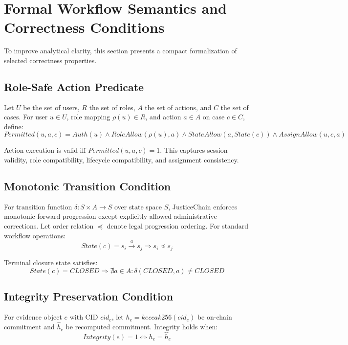 \documentclass[conference]{IEEEtran}
\begin{document}
\section{Formal Workflow Semantics and Correctness Conditions}
To improve analytical clarity, this section presents a compact formalization of selected correctness properties.

\subsection{Role-Safe Action Predicate}
Let $U$ be the set of users, $R$ the set of roles, $A$ the set of actions, and $C$ the set of cases. For user $u \in U$, role mapping $\rho(u) \in R$, and action $a \in A$ on case $c \in C$, define:
\begin{equation}
Permitted(u,a,c) = Auth(u) \land RoleAllow(\rho(u),a) \land StateAllow(a,State(c)) \land AssignAllow(u,c,a)
\end{equation}

Action execution is valid iff $Permitted(u,a,c)=1$. This captures session validity, role compatibility, lifecycle compatibility, and assignment consistency.

\subsection{Monotonic Transition Condition}
For transition function $\delta: S \times A \rightarrow S$ over state space $S$, JusticeChain enforces monotonic forward progression except explicitly allowed administrative corrections. Let order relation $\preceq$ denote legal progression ordering. For standard workflow operations:
\begin{equation}
State(c) = s_i \xrightarrow{a} s_j \Rightarrow s_i \preceq s_j
\end{equation}

Terminal closure state satisfies:
\begin{equation}
State(c)=CLOSED \Rightarrow \nexists a \in A : \delta(CLOSED,a) \neq CLOSED
\end{equation}

\subsection{Integrity Preservation Condition}
For evidence object $e$ with CID $cid_e$, let $h_e=keccak256(cid_e)$ be on-chain commitment and $\hat{h}_e$ be recomputed commitment. Integrity holds when:
\begin{equation}
Integrity(e)=1 \Leftrightarrow h_e = \hat{h}_e
\end{equation}
\end{document}
